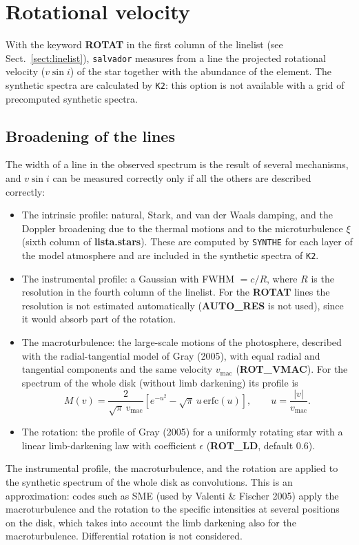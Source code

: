 \documentclass[modern]{aastex701}
\begin{document}
\section{Rotational velocity} \label{sect:rotation}
\hrulefill

With the keyword {\bf ROTAT} in the first column of the linelist (see Sect.~\ref{sect:linelist}), \texttt{salvador} measures from a line the projected rotational velocity ($v \sin i$) of the star together with the abundance of the element. The synthetic spectra are calculated by \texttt{K2}: this option is not available with a grid of precomputed synthetic spectra.

\subsection{Broadening of the lines}
The width of a line in the observed spectrum is the result of several mechanisms, and $v \sin i$ can be measured correctly only if all the others are described correctly:
\begin{itemize}
    \item The intrinsic profile: natural, Stark, and van der Waals damping, and the Doppler broadening due to the thermal motions and to the microturbulence $\xi$ (sixth column of {\bf lista.stars}). These are computed by \texttt{SYNTHE} for each layer of the model atmosphere and are included in the synthetic spectra of \texttt{K2}.
    \item The instrumental profile: a Gaussian with FWHM $= c/R$, where $R$ is the resolution in the fourth column of the linelist. For the {\bf ROTAT} lines the resolution is not estimated automatically ({\bf AUTO\_RES} is not used), since it would absorb part of the rotation.
    \item The macroturbulence: the large-scale motions of the photosphere, described with the radial-tangential model of Gray (2005), with equal radial and tangential components and the same velocity $v_{\mathrm{mac}}$ ({\bf ROT\_VMAC}). For the spectrum of the whole disk (without limb darkening) its profile is
    \begin{equation}
        M(v) = \frac{2}{\sqrt{\pi}\, v_{\mathrm{mac}}} \left[ e^{-u^2} - \sqrt{\pi}\, u\, \mathrm{erfc}(u) \right], \qquad u = \frac{|v|}{v_{\mathrm{mac}}}.
    \end{equation}
    \item The rotation: the profile of Gray (2005) for a uniformly rotating star with a linear limb-darkening law with coefficient $\epsilon$ ({\bf ROT\_LD}, default 0.6).
\end{itemize}
The instrumental profile, the macroturbulence, and the rotation are applied to the synthetic spectrum of the whole disk as convolutions. This is an approximation: codes such as SME (used by Valenti \& Fischer 2005) apply the macroturbulence and the rotation to the specific intensities at several positions on the disk, which takes into account the limb darkening also for the macroturbulence. Differential rotation is not considered.
\end{document}
